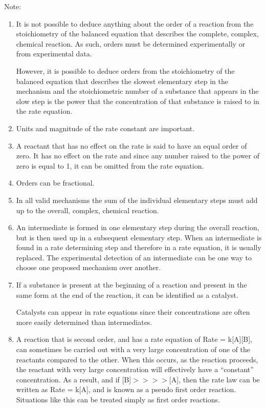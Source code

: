 \documentclass[../chem.tex]{subfiles}
\begin{document}
Note:
\begin{enumerate}
    \item It is not possible to deduce anything about the order of a reaction from the stoichiometry of the balanced equation that describes the complete, complex, chemical reaction. As such, orders must be determined experimentally or from experimental data.
    
    However, it is possible to deduce orders from the stoichiometry of the balanced equation that describes the slowest elementary step in the mechanism and the stoichiometric number of a substance that appears in the slow step is the power that the concentration of that substance is raised to in the rate equation.
    \item Units and magnitude of the rate constant are important.
    \item A reactant that has no effect on the rate is said to have an equal order of zero. It has no effect on the rate and since any number raised to the power of zero is equal to 1, it can be omitted from the rate equation.
    \item Orders can be fractional.
    \item In all valid mechanisms the sum of the individual elementary steps must add up to the overall, complex, chemical reaction.
    \item An intermediate is formed in one elementary step during the overall reaction, but is then used up in a subsequent elementary step. When an intermediate is found in a rate determining step and therefore in a rate equation, it is usually replaced. The experimental detection of an intermediate can be one way to choose one proposed mechanism over another.
    \item If a substance is present at the beginning of a reaction and present in the same form at the end of the reaction, it can be identified as a catalyst.
    
    Catalysts can appear in rate equations since their concentrations are often more easily determined than intermediates.
    \item A reaction that is second order, and has a rate equation of Rate = k[A][B], can sometimes be carried out with a very large concentration of one of the reactants compared to the other. When this occurs, as the reaction proceeds, 
    the reactant with very large concentration will effectively have a ``constant'' concentration. As a result, and if [B]$>>>>$[A], then the rate law can be written as Rate = k[A], and is known 
    as a pseudo first order reaction. Situations like this can be treated simply as first order reactions.
\end{enumerate}
\end{document}
